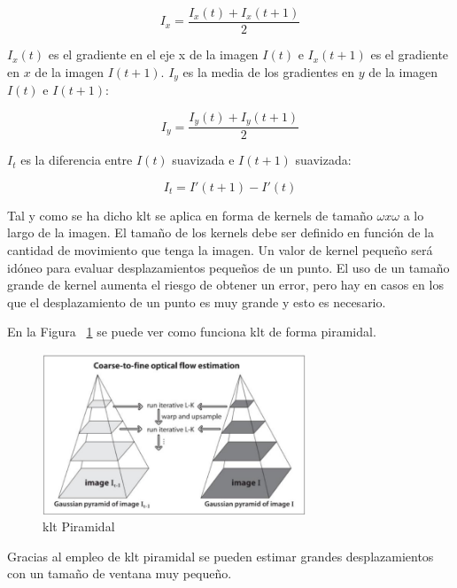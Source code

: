 \begin{equation}
    I_x = \frac{I_x(t)+I_x(t+1)}{2}
\end{equation}

$I_x(t)$ es el gradiente en el eje x de la imagen $I(t)$ e $I_x(t+1)$ es el gradiente en $x$ de la imagen $I(t+1)$. $I_y$ es la media de los gradientes en $y$ de la imagen $I(t)$ e $I(t+1)$:

\begin{equation}
    I_y = \frac{I_y(t)+I_y(t+1)}{2}
\end{equation}

$I_t$ es la diferencia entre $I(t)$ suavizada e $I(t+1)$ suavizada:

\begin{equation}
   I_t = I'(t+1) - I'(t) 
\end{equation}

Tal y como se ha dicho \acrshort{klt} se aplica en forma de kernels de tamaño $\omega x \omega$ a lo largo de la imagen. El tamaño de los kernels debe ser definido en función de la cantidad de movimiento que tenga la imagen. Un valor de kernel pequeño será idóneo para evaluar desplazamientos pequeños de un punto. El uso de un tamaño grande de kernel aumenta el riesgo de obtener un error, pero hay en casos en los que el desplazamiento de un punto es muy grande y esto es necesario.

En la Figura ~\ref{fig.klt_piramidal} se puede ver como funciona \acrshort{klt} de forma piramidal.

 \begin{figure}
\begin{center}
	\includegraphics[width=0.7\textwidth]{figures/Diseno_global/klt_piramidal.png}
   \caption{\acrshort{klt} Piramidal}
	\label{fig.klt_piramidal}
\end{center}
\end{figure}

Gracias al empleo de \acrshort{klt} piramidal se pueden estimar grandes desplazamientos con un tamaño de ventana muy pequeño.

